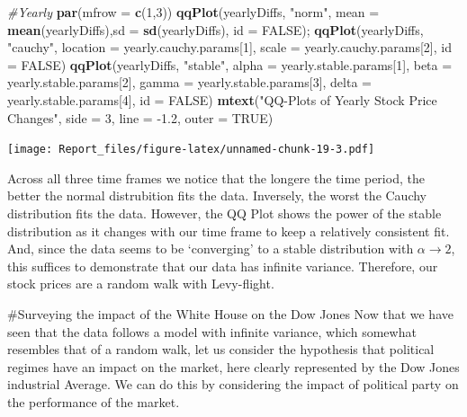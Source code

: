 \documentclass[]{article}
\newenvironment{Shaded}{\begin{snugshade}}{\end{snugshade}}
\newcommand{\CommentTok}[1]{\textcolor[rgb]{0.56,0.35,0.01}{\textit{#1}}}
\newcommand{\DataTypeTok}[1]{\textcolor[rgb]{0.13,0.29,0.53}{#1}}
\newcommand{\DecValTok}[1]{\textcolor[rgb]{0.00,0.00,0.81}{#1}}
\newcommand{\FloatTok}[1]{\textcolor[rgb]{0.00,0.00,0.81}{#1}}
\newcommand{\KeywordTok}[1]{\textcolor[rgb]{0.13,0.29,0.53}{\textbf{#1}}}
\newcommand{\NormalTok}[1]{#1}
\newcommand{\OtherTok}[1]{\textcolor[rgb]{0.56,0.35,0.01}{#1}}
\newcommand{\StringTok}[1]{\textcolor[rgb]{0.31,0.60,0.02}{#1}}
\begin{document}
\begin{Shaded}
\begin{Highlighting}[]
\CommentTok{#Yearly}
\KeywordTok{par}\NormalTok{(}\DataTypeTok{mfrow =} \KeywordTok{c}\NormalTok{(}\DecValTok{1}\NormalTok{,}\DecValTok{3}\NormalTok{))}
\KeywordTok{qqPlot}\NormalTok{(yearlyDiffs, }\StringTok{"norm"}\NormalTok{, }\DataTypeTok{mean =}  \KeywordTok{mean}\NormalTok{(yearlyDiffs),}\DataTypeTok{sd =}  \KeywordTok{sd}\NormalTok{(yearlyDiffs), }\DataTypeTok{id =} \OtherTok{FALSE}\NormalTok{); }
\KeywordTok{qqPlot}\NormalTok{(yearlyDiffs, }\StringTok{"cauchy"}\NormalTok{, }\DataTypeTok{location =}\NormalTok{  yearly.cauchy.params[}\DecValTok{1}\NormalTok{], }\DataTypeTok{scale =}\NormalTok{ yearly.cauchy.params[}\DecValTok{2}\NormalTok{], }\DataTypeTok{id =} \OtherTok{FALSE}\NormalTok{)}
\KeywordTok{qqPlot}\NormalTok{(yearlyDiffs, }\StringTok{"stable"}\NormalTok{, }\DataTypeTok{alpha =}\NormalTok{ yearly.stable.params[}\DecValTok{1}\NormalTok{], }\DataTypeTok{beta =}\NormalTok{ yearly.stable.params[}\DecValTok{2}\NormalTok{], }\DataTypeTok{gamma =}\NormalTok{ yearly.stable.params[}\DecValTok{3}\NormalTok{], }\DataTypeTok{delta =}\NormalTok{ yearly.stable.params[}\DecValTok{4}\NormalTok{], }\DataTypeTok{id =} \OtherTok{FALSE}\NormalTok{)}
\KeywordTok{mtext}\NormalTok{(}\StringTok{"QQ-Plots of Yearly Stock Price Changes"}\NormalTok{, }\DataTypeTok{side =} \DecValTok{3}\NormalTok{, }\DataTypeTok{line =} \FloatTok{-1.2}\NormalTok{, }\DataTypeTok{outer =} \OtherTok{TRUE}\NormalTok{)}
\end{Highlighting}
\end{Shaded}

\texttt{[image: Report\_files/figure-latex/unnamed-chunk-19-3.pdf]}

Across all three time frames we notice that the longere the time period,
the better the normal distrubition fits the data. Inversely, the worst
the Cauchy distribution fits the data. However, the QQ Plot shows the
power of the stable distribution as it changes with our time frame to
keep a relatively consistent fit. And, since the data seems to be
`converging' to a stable distribution with \(\alpha \xrightarrow{} 2\),
this suffices to demonstrate that our data has infinite variance.
Therefore, our stock prices are a random walk with Levy-flight.

\#Surveying the impact of the White House on the Dow Jones Now that we
have seen that the data follows a model with infinite variance, which
somewhat resembles that of a random walk, let us consider the hypothesis
that political regimes have an impact on the market, here clearly
represented by the Dow Jones industrial Average. We can do this by
considering the impact of political party on the performance of the
market.
\end{document}
